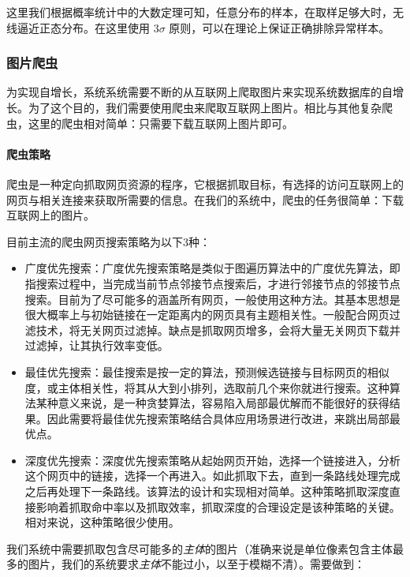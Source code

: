\documentclass[bachelor,zhspacing]{cqu}  %
\begin{document}
这里我们根据概率统计中的大数定理可知，任意分布的样本，在取样足够大时，无线逼近正态分布。在这里使用
\(3\sigma\) 原则，可以在理论上保证正确排除异常样本。

\subsubsection{图片爬虫}\label{ux56feux7247ux722cux866b}

为实现自增长，系统系统需要不断的从互联网上爬取图片来实现系统数据库的自增长。为了这个目的，我们需要使用爬虫来爬取互联网上图片。相比与其他复杂爬虫，这里的爬虫相对简单：只需要下载互联网上图片即可。

\paragraph{爬虫策略}\label{ux722cux866bux7b56ux7565}

爬虫是一种定向抓取网页资源的程序，它根据抓取目标，有选择的访问互联网上的网页与相关连接来获取所需要的信息。在我们的系统中，爬虫的任务很简单：下载互联网上的图片。

目前主流的爬虫网页搜索策略为以下3种：

\begin{itemize}
\item
  广度优先搜索：广度优先搜索策略是类似于图遍历算法中的广度优先算法，即指搜索过程中，当完成当前节点邻接节点搜索后，才进行邻接节点的邻接节点搜索。目前为了尽可能多的涵盖所有网页，一般使用这种方法。其基本思想是很大概率上与初始链接在一定距离内的网页具有主题相关性。一般配合网页过滤技术，将无关网页过滤掉。缺点是抓取网页增多，会将大量无关网页下载并过滤掉，让其执行效率变低。
\item
  最佳优先搜索：最佳搜索是按一定的算法，预测候选链接与目标网页的相似度，或主体相关性，将其从大到小排列，选取前几个来你就进行搜索。这种算法某种意义来说，是一种贪婪算法，容易陷入局部最优解而不能很好的获得结果。因此需要将最佳优先搜索策略结合具体应用场景进行改进，来跳出局部最优点。
\item
  深度优先搜索：深度优先搜索策略从起始网页开始，选择一个链接进入，分析这个网页中的链接，选择一个再进入。如此抓取下去，直到一条路线处理完成之后再处理下一条路线。该算法的设计和实现相对简单。这种策略抓取深度直接影响着抓取命中率以及抓取效率，抓取深度的合理设定是该种策略的关键。相对来说，这种策略很少使用。
\end{itemize}

我们系统中需要抓取包含尽可能多的\emph{主体}的图片（准确来说是单位像素包含主体最多的图片，我们的系统要求\emph{主体}不能过小，以至于模糊不清）。需要做到：
\end{document}
